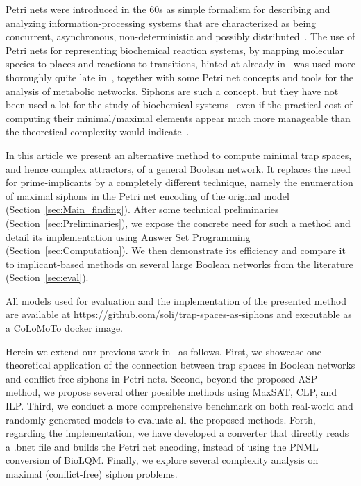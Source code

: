 \documentclass[preprint,12pt]{elsarticle}
\begin{document}
Petri nets were introduced in the 60s as simple formalism for describing and analyzing information-processing systems that are characterized as being concurrent, asynchronous, non-deterministic and possibly distributed~\cite{peterson1981petri,Murata1989}.
The use of Petri nets for representing biochemical reaction systems, by mapping molecular species to places and reactions to transitions, hinted at already in~\cite{peterson1981petri,Murata1989} was used more thoroughly quite late in~\cite{reddy1993petri}, together with some Petri net concepts and tools for the analysis of metabolic networks.
Siphons are such a concept, but they have not been used a lot for the study of biochemical systems~\cite{zevedei2003topological,blatke2015biomodel} even if the practical cost of computing their minimal/maximal elements appear much more manageable than the theoretical complexity would indicate~\cite{oanea2010new,nabli2016enumerating}.

In this article we present an alternative method to compute minimal trap spaces, and hence complex attractors, of a general Boolean network. It replaces the need for prime-implicants by a completely different technique, namely the enumeration of maximal siphons in the Petri net encoding of the original model (Section~\ref{sec:Main_finding}).
After some technical preliminaries (Section~\ref{sec:Preliminaries}), we expose the concrete need for such a method and detail its implementation using Answer Set Programming (Section~\ref{sec:Computation}).
We then demonstrate its efficiency and compare it to implicant-based methods on several large Boolean networks from the literature (Section~\ref{sec:eval}).

All models used for evaluation and the implementation of the presented method are available at \url{https://github.com/soli/trap-spaces-as-siphons} and executable as a CoLoMoTo docker image.

Herein we extend our previous work in~\cite{DBLP:conf/cmsb/TrinhBHS22} as follows.
First, we showcase one theoretical application of the connection between trap spaces in Boolean networks and conflict-free siphons in Petri nets.
Second, beyond the proposed ASP method, we propose several other possible methods using MaxSAT, CLP, and ILP.
Third, we conduct a more comprehensive benchmark on both real-world and randomly generated models to evaluate all the proposed methods.
Forth, regarding the implementation, we have developed a converter that directly reads a .bnet file and builds the Petri net encoding, instead of using the PNML conversion of BioLQM.
Finally, we explore several complexity analysis on maximal (conflict-free) siphon problems.
\end{document}
